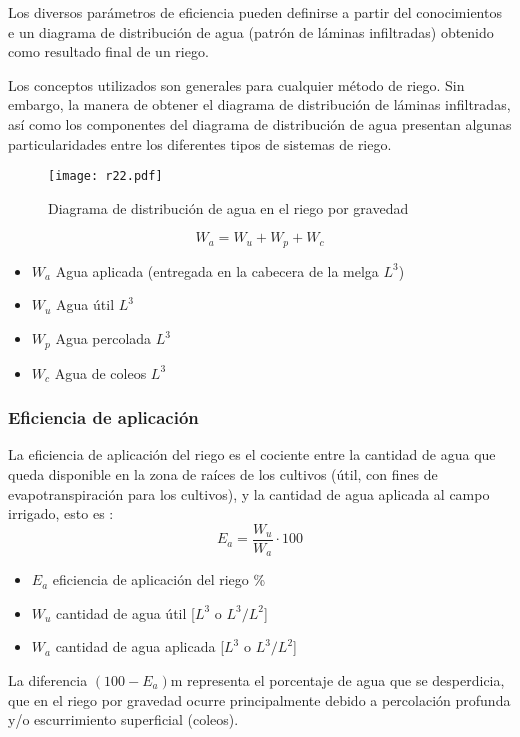 Los diversos parámetros de eficiencia pueden definirse a partir del conocimientos e un diagrama de distribución de agua (patrón de láminas infiltradas) obtenido como resultado final de un riego.

Los conceptos utilizados son generales para cualquier método de riego. Sin embargo, la manera de obtener el diagrama de distribución de láminas infiltradas, así como los componentes del diagrama de distribución de agua presentan algunas particularidades entre los diferentes tipos de sistemas de riego.
\begin{figure}[h!]
\centering
  \texttt{[image: r22.pdf]}
  \caption{Diagrama de distribución de agua en el riego por gravedad}
  \label{r22}
\end{figure}
\begin{equation}
    W_a = W_u + W_p+ W_c
\end{equation}
\begin{notation}
    \begin{itemize}
        \item $W_a$ Agua aplicada (entregada en la cabecera de la melga $L^3$)
        \item $W_u$ Agua útil $L^3$
        \item $W_p$ Agua percolada $L^3$
        \item $W_c$ Agua de coleos $L^3$
    \end{itemize}
\end{notation}
\subsubsection{Eficiencia de aplicación}
La eficiencia de aplicación del riego es el cociente entre la cantidad de agua que queda disponible en la zona de raíces de los cultivos (útil, con fines de evapotranspiración para los cultivos), y la cantidad de agua aplicada al campo irrigado, esto es :
\begin{equation}
    E_a = \frac{W_u}{W_a} \cdot 100
\end{equation}
\begin{notation}
    \begin{itemize}
        \item $E_a$ eficiencia de aplicación del riego \%
        \item $W_u$ cantidad de agua útil [$L^3$ o $L^3/L^2$]
        \item $W_a$ cantidad de agua aplicada [$L^3$ o $L^3/L^2$]
    \end{itemize}
\end{notation}
La diferencia $(100-E_a)$m representa el porcentaje de agua que se desperdicia, que en el riego por gravedad ocurre principalmente debido a percolación profunda y/o escurrimiento superficial (coleos).


